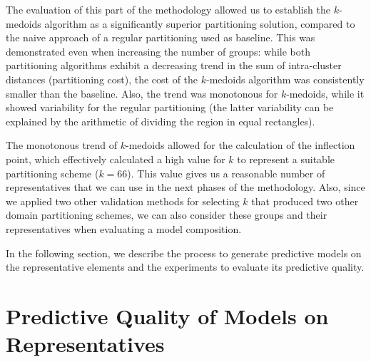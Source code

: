 The evaluation of this part of the methodology allowed us to establish the $k$-medoids algorithm as a significantly superior partitioning solution, compared to the naive approach of a regular partitioning used as baseline. This was demonstrated even when increasing the number of groups: while both partitioning algorithms exhibit a decreasing trend in the sum of intra-cluster distances (partitioning cost), the cost of the $k$-medoids algorithm was consistently smaller than the baseline. Also, the trend was monotonous for $k$-medoids, while it showed variability for the regular partitioning (the latter variability can be explained by the arithmetic of dividing the region in equal rectangles). 

The monotonous trend of $k$-medoids allowed for the calculation of the inflection point, which effectively calculated a high value for $k$ to represent a suitable partitioning scheme ($k = 66$). This value gives us a reasonable number of representatives that we can use in the next phases of the methodology. Also, since we applied two other validation methods for selecting $k$ that produced two other domain partitioning schemes, we can also consider these groups and their representatives when evaluating a model composition. 



In the following section, we describe the process to generate predictive models on the representative elements and the experiments to evaluate its predictive quality.

\section{Predictive Quality of Models on Representatives}
\label{Sec:AnalyzePredictorRepresentatives}

